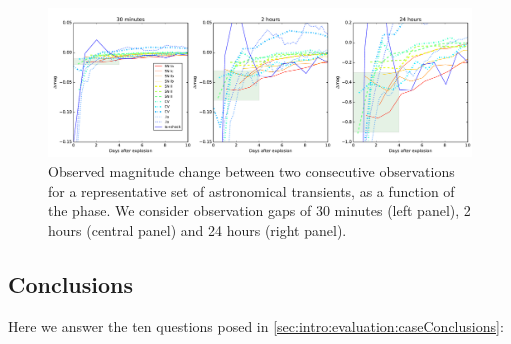 \begin{figure}[hbt]
\centerline{
\includegraphics[width=\textwidth]{figs/transients/earlyrise1.pdf}
}
\caption{Observed magnitude change between two consecutive observations for a representative set of astronomical transients, as a function of the phase. We consider observation gaps of 30 minutes  (left panel), 2 hours (central panel) and 24 hours (right panel).
}
\label{fig:earlyrise}
\end{figure}


 \subsection{Conclusions}

 Here we answer the ten questions posed in
 \autoref{sec:intro:evaluation:caseConclusions}:


